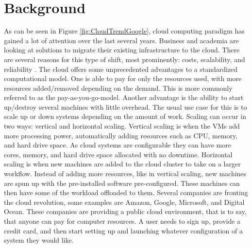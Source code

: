 \documentclass[12pt]{article}
\begin{document}
\section{Background}
As can be seen in Figure \ref{fig:CloudTrendGoogle}, cloud computing paradigm has gained a lot of attention over the last several years. Business and academia are looking at solutions to migrate their existing infrastructure to the cloud. There are several reasons for this type of shift, most prominently: costs, scalability, and reliability \cite{DillonWuChang}. The cloud offers some unprecedented advantages to a standardized computational model. One is able to pay for only the resources used, with more resources added/removed depending on the demand. This is more commonly referred to as the pay-as-you-go-model. Another advantage is the ability to start up/destroy several machines with little overhead. The usual use case for this is to scale up or down systems depending on the amount of work. Scaling can occur in two ways: vertical and horizontal scaling. Vertical scaling is when the VMs add more processing power, automatically adding resources such as CPU, memory, and hard drive space. As cloud systems are configurable they can have more cores, memory, and hard drive space allocated with no downtime. Horizontal scaling is when new machines are added to the cloud cluster to take on a larger workflow. Instead of adding more resources, like in vertical scaling, new machines are spun up with the pre-installed software pre-configured. These machines can then have some of the workload offloaded to them. Several companies are fronting the cloud revolution, some examples are Amazon\cite{amazonaws2017}, Google\cite{GoogleCloudCompute2017}, Microsoft\cite{Azure2017}, and Digital Ocean\cite{DigitalOcian2017}. These companies are providing a public cloud environment, that is to say, that anyone can pay for computer resources. A user needs to sign up, provide a credit card, and then start setting up and launching whatever configuration of a system they would like.
\end{document}
